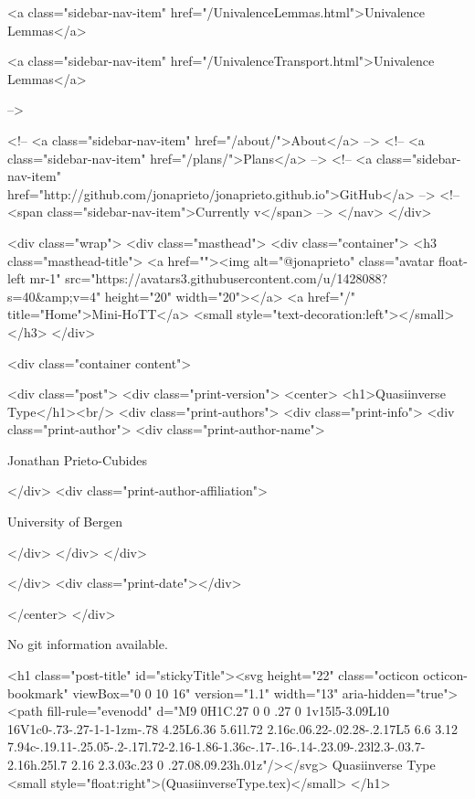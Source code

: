           <a class="sidebar-nav-item" href="/UnivalenceLemmas.html">Univalence Lemmas</a>
        
      
    
      
        
          <a class="sidebar-nav-item" href="/UnivalenceTransport.html">Univalence Lemmas</a>
        
      
     -->

    <!-- <a class="sidebar-nav-item" href="/about/">About</a> -->
    <!-- <a class="sidebar-nav-item" href="/plans/">Plans</a> -->
    <!-- <a class="sidebar-nav-item" href="http://github.com/jonaprieto/jonaprieto.github.io">GitHub</a> -->
    <!-- <span class="sidebar-nav-item">Currently v</span> -->
  </nav>
</div>

    <div class="wrap">
      <div class="masthead">
        <div class="container">
          <h3 class="masthead-title">
            <a href=""><img alt="@jonaprieto" class="avatar float-left mr-1" src="https://avatars3.githubusercontent.com/u/1428088?s=40&amp;v=4" height="20" width="20"></a>
            <a href="/" title="Home">Mini-HoTT</a>
            <small style="text-decoration:left"></small>
          </h3>
        </div>
      
      <div class="container content">
        







<div class="post">
  <div class="print-version">
    <center>
      <h1>Quasiinverse Type</h1><br/>
        <div class="print-authors">
          <div class="print-info">
            <div class="print-author">
              <div class="print-author-name">
                
                  Jonathan Prieto-Cubides
                
              </div>
              <div class="print-author-affiliation">
                
                  University of Bergen
                
                </div>
            </div>
          </div>
          
          
        </div>
        <div class="print-date"></div>
        
        
    </center>
  </div>

  
  No git information available.
  

  <h1 class="post-title" id="stickyTitle"><svg height="22" class="octicon octicon-bookmark" viewBox="0 0 10 16" version="1.1" width="13" aria-hidden="true"><path fill-rule="evenodd" d="M9 0H1C.27 0 0 .27 0 1v15l5-3.09L10 16V1c0-.73-.27-1-1-1zm-.78 4.25L6.36 5.61l.72 2.16c.06.22-.02.28-.2.17L5 6.6 3.12 7.94c-.19.11-.25.05-.2-.17l.72-2.16-1.86-1.36c-.17-.16-.14-.23.09-.23l2.3-.03.7-2.16h.25l.7 2.16 2.3.03c.23 0 .27.08.09.23h.01z"/></svg> Quasiinverse Type <small style="float:right">(QuasiinverseType.tex)</small>
  </h1>

